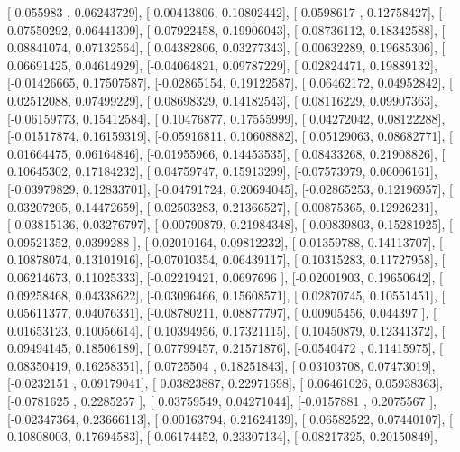 \documentclass{article}
\begin{document}
       [ 0.055983  ,  0.06243729],
       [-0.00413806,  0.10802442],
       [-0.0598617 ,  0.12758427],
       [ 0.07550292,  0.06441309],
       [ 0.07922458,  0.19906043],
       [-0.08736112,  0.18342588],
       [ 0.08841074,  0.07132564],
       [ 0.04382806,  0.03277343],
       [ 0.00632289,  0.19685306],
       [ 0.06691425,  0.04614929],
       [-0.04064821,  0.09787229],
       [ 0.02824471,  0.19889132],
       [-0.01426665,  0.17507587],
       [-0.02865154,  0.19122587],
       [ 0.06462172,  0.04952842],
       [ 0.02512088,  0.07499229],
       [ 0.08698329,  0.14182543],
       [ 0.08116229,  0.09907363],
       [-0.06159773,  0.15412584],
       [ 0.10476877,  0.17555999],
       [ 0.04272042,  0.08122288],
       [-0.01517874,  0.16159319],
       [-0.05916811,  0.10608882],
       [ 0.05129063,  0.08682771],
       [ 0.01664475,  0.06164846],
       [-0.01955966,  0.14453535],
       [ 0.08433268,  0.21908826],
       [ 0.10645302,  0.17184232],
       [ 0.04759747,  0.15913299],
       [-0.07573979,  0.06006161],
       [-0.03979829,  0.12833701],
       [-0.04791724,  0.20694045],
       [-0.02865253,  0.12196957],
       [ 0.03207205,  0.14472659],
       [ 0.02503283,  0.21366527],
       [ 0.00875365,  0.12926231],
       [-0.03815136,  0.03276797],
       [-0.00790879,  0.21984348],
       [ 0.00839803,  0.15281925],
       [ 0.09521352,  0.0399288 ],
       [-0.02010164,  0.09812232],
       [ 0.01359788,  0.14113707],
       [ 0.10878074,  0.13101916],
       [-0.07010354,  0.06439117],
       [ 0.10315283,  0.11727958],
       [ 0.06214673,  0.11025333],
       [-0.02219421,  0.0697696 ],
       [-0.02001903,  0.19650642],
       [ 0.09258468,  0.04338622],
       [-0.03096466,  0.15608571],
       [ 0.02870745,  0.10551451],
       [ 0.05611377,  0.04076331],
       [-0.08780211,  0.08877797],
       [ 0.00905456,  0.044397  ],
       [ 0.01653123,  0.10056614],
       [ 0.10394956,  0.17321115],
       [ 0.10450879,  0.12341372],
       [ 0.09494145,  0.18506189],
       [ 0.07799457,  0.21571876],
       [-0.0540472 ,  0.11415975],
       [ 0.08350419,  0.16258351],
       [ 0.0725504 ,  0.18251843],
       [ 0.03103708,  0.07473019],
       [-0.0232151 ,  0.09179041],
       [ 0.03823887,  0.22971698],
       [ 0.06461026,  0.05938363],
       [-0.0781625 ,  0.2285257 ],
       [ 0.03759549,  0.04271044],
       [-0.0157881 ,  0.2075567 ],
       [-0.02347364,  0.23666113],
       [ 0.00163794,  0.21624139],
       [ 0.06582522,  0.07440107],
       [ 0.10808003,  0.17694583],
       [-0.06174452,  0.23307134],
       [-0.08217325,  0.20150849],
\end{document}
